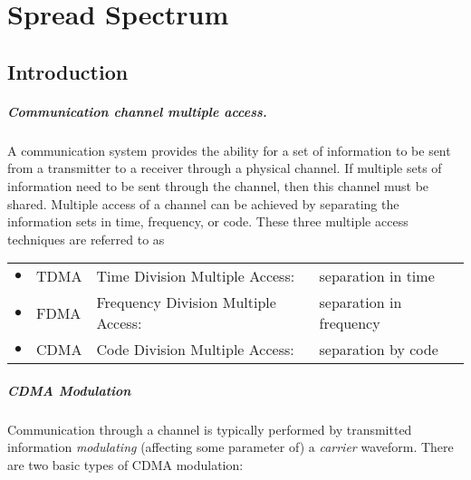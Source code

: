 

\chapter{Spread Spectrum}
\label{chp:cdma}
\section{Introduction}
\paragraph{Communication channel multiple access.}
A communication system provides the ability for 
a set of information to be 
sent from a transmitter to a receiver through a physical channel.
If multiple sets of information need to be sent through the channel,
then this channel must be shared.
Multiple access of a channel can be achieved by separating the information sets in
time, frequency, or code.  
These three multiple access techniques are referred to as

\begin{tabular}{clll}
   $\bullet$ & TDMA & Time Division Multiple Access:      & separation in time \\
   $\bullet$ & FDMA & Frequency Division Multiple Access: & separation in frequency \\
   $\bullet$ & CDMA & Code Division Multiple Access:      & separation by code 
\end{tabular}

\paragraph{CDMA Modulation}
Communication through a channel is typically performed by transmitted information 
{\em modulating} (affecting some parameter of) a {\em carrier} waveform.
There are two basic types of CDMA modulation:

